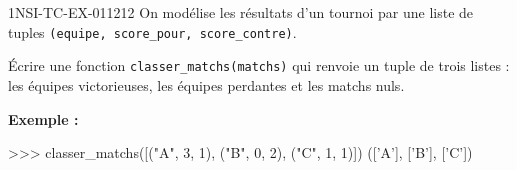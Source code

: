 \begin{exercice}{1NSI-TC-EX-011}{2}{12}
On modélise les résultats d'un tournoi par une liste de tuples
\lstinline{(equipe, score_pour, score_contre)}.

Écrire une fonction \lstinline{classer_matchs(matchs)} qui renvoie un tuple de trois
listes : les équipes victorieuses, les équipes perdantes et les matchs nuls.

\textbf{Exemple :}
\begin{console}
>>> classer_matchs([("A", 3, 1), ("B", 0, 2), ("C", 1, 1)])
(['A'], ['B'], ['C'])
\end{console}
\end{exercice}
